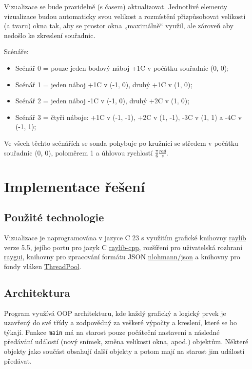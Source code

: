 \documentclass[12pt,a4paper]{article}
\newcommand{\code}[1]{\texttt{#1}}
\def\CC{{C\nolinebreak[4]\hspace{-.05em}\raisebox{.4ex}{\tiny\bf ++}}}
\begin{document}
Vizualizace se bude pravidelně (s časem) aktualizovat. Jednotlivé elementy
vizualizace budou automaticky svou velikost a rozmístění přizpůsobovat velikosti
(a tvaru) okna tak, aby se prostor okna „maximálně“ využil, ale zároveň aby
nedošlo ke zkreslení souřadnic.

Scénáře:

\begin{itemize}
  \item Scénář 0 = pouze jeden bodový náboj +1C v počátku souřadnic (0, 0);
  \item Scénář 1 = jeden náboj +1C v (-1, 0), druhý +1C v (1, 0);
  \item Scénář 2 = jeden náboj -1C v (-1, 0), druhý +2C v (1, 0);
  \item Scénář 3 = čtyři náboje: +1C v (-1, -1), +2C v (1, -1), -3C v (1, 1)
    a -4C v (-1, 1);
\end{itemize}

Ve všech těchto scénářích se sonda pohybuje po kružnici se středem v počátku
souřadnic (0, 0), poloměrem 1 a úhlovou rychlostí \( \frac{\pi}{6}
\frac{rad}{s} \).

\section{Implementace řešení}

\subsection{Použité technologie}

Vizualizace je naprogramována v jazyce \CC{} 23 s využitím grafické knihovny
\href{https://www.raylib.com/}{raylib} verze 5.5, jejího portu pro jazyk \CC{}
\href{https://github.com/RobLoach/raylib-cpp}{raylib-cpp}, rozšíření pro
uživatelská rozhraní \href{https://github.com/raysan5/raygui}{raygui}, knihovny
pro zpracování formátu JSON
\href{https://github.com/nlohmann/json}{nlohmann/json} a knihovny pro fondy
vláken \href{https://github.com/progschj/ThreadPool}{ThreadPool}.

\subsection{Architektura}

Program využívá OOP architekturu, kde každý grafický a logický prvek je uzavřený
do své třídy a zodpovědný za veškeré výpočty a kreslení, které se ho týkají.
Funkce \code{main} má na starost pouze počáteční nastavení a následné předávání
událostí (nový snímek, změna velikosti okna, apod.) objektům. Některé objekty
jako součást obsahují další objekty a potom mají na starost jim události
předávat.
\end{document}
